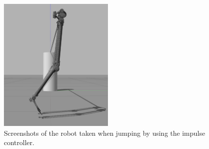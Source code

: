 

\begin{figure}[ht!]
     \centering
    \includegraphics[width=0.5\textwidth]{figures/gazebo_jumping}
    \caption{Screenshots of the robot taken when jumping by using the impulse controller.}
     \label{fig:gazebo_jumping}
\end{figure}  


